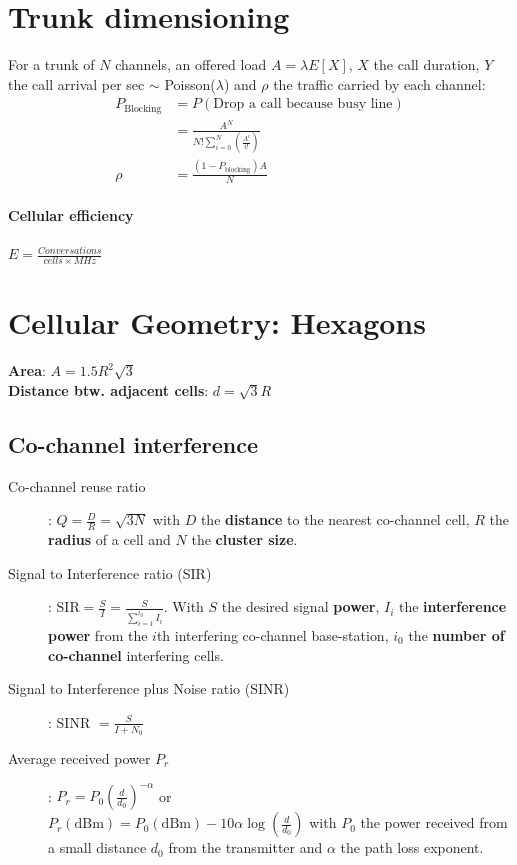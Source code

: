 \documentclass[6pt]{scrartcl}
\begin{document}
\begin{multicols}{4}
\section{Trunk dimensioning}
For a trunk of $N$ channels, an offered load $A=\lambda E[X]$, $X$ the call duration, $Y$ the call arrival per sec $\sim$ Poisson($\lambda$) and $\rho$ the traffic carried by each channel: 
\begin{align*}
	P_\textrm{Blocking} &= P(\textrm{Drop a call because busy line})  \\
	&= \frac{A^N}{N!\sum^N_{i=0}(\frac{A^i}{i!})}\\
	\rho &= \frac{(1 - P_\textrm{blocking})A}{N}
\end{align*}


\paragraph{Cellular efficiency} $E = \frac{Conversations}{cells\times MHz}$

\section{Cellular Geometry: Hexagons}

\textbf{Area}: $A=1.5R^2\sqrt{3}$\\
\textbf{Distance btw. adjacent cells}: $d=\sqrt{3}R$

\subsection{Co-channel interference}
\begin{description}
\item[Co-channel reuse ratio]: $Q = \frac{D}{R} = \sqrt{3N}$ with $D$ the \textbf{distance} to the nearest co-channel cell, $R$ the \textbf{radius} of a cell and $N$ the \textbf{cluster size}.

\item[Signal to Interference ratio (SIR)]: $\textrm{SIR} = \frac{S}{I} = \frac{S}{\sum^{i_0}_{i=1}I_i}$. With $S$ the desired signal \textbf{power}, $I_i$ the \textbf{interference power} from the $i$th interfering co-channel base-station, $i_0$ the \textbf{number of co-channel} interfering cells.

\item[Signal to Interference plus Noise ratio (SINR)] : SINR $= \frac{S}{I + N_0}$

\item[Average received power $P_r$]: $P_r = P_0(\frac{d}{d_0})^{-\alpha}$ or \\ 
$P_r(\textrm{dBm}) = P_0(\textrm{dBm})-10\alpha\log(\frac{d}{d_0})$ with $P_0$ the power received from a small distance $d_0$ from the transmitter and $\alpha$ the path loss exponent.
	

\end{description}
\end{multicols}
\end{document}
